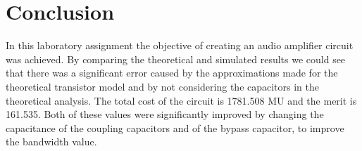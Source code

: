 \pagebreak
\section{Conclusion}
\label{sec:conclusion}

In this laboratory assignment the objective of creating an audio amplifier circuit was achieved. By comparing the theoretical and simulated results we could see that there was a significant error caused by the approximations made for the theoretical transistor model and by not considering the capacitors in the theoretical analysis.
The total cost of the circuit is 1781.508 MU and the merit is 161.535. Both of these values were significantly improved by changing the capacitance of the coupling capacitors and of the bypass capacitor, to improve the bandwidth value. 
